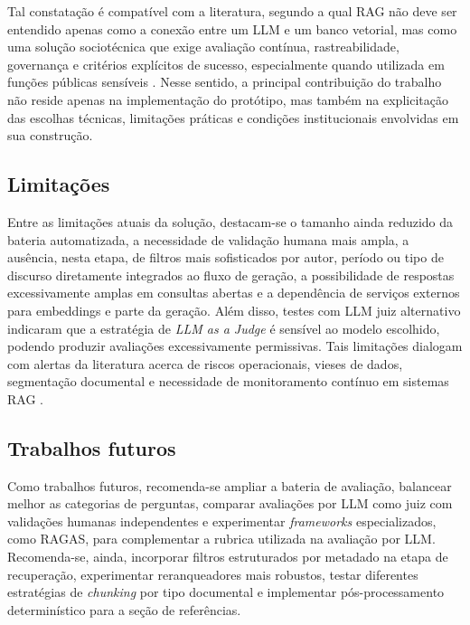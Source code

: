 Tal constatação é compatível com a literatura, segundo a qual RAG não deve ser entendido apenas como a conexão entre um LLM e um banco vetorial, mas como uma solução sociotécnica que exige avaliação contínua, rastreabilidade, governança e critérios explícitos de sucesso, especialmente quando utilizada em funções públicas sensíveis \parencite{gao2023ragSurvey,deAlmeidaSantos2025aiGovernance,saadFalconEtAl2024ares}. Nesse sentido, a principal contribuição do trabalho não reside apenas na implementação do protótipo, mas também na explicitação das escolhas técnicas, limitações práticas e condições institucionais envolvidas em sua construção.

\subsection{Limitações}

Entre as limitações atuais da solução, destacam-se o tamanho ainda reduzido da bateria automatizada, a necessidade de validação humana mais ampla, a ausência, nesta etapa, de filtros mais sofisticados por autor, período ou tipo de discurso diretamente integrados ao fluxo de geração, a possibilidade de respostas excessivamente amplas em consultas abertas e a dependência de serviços externos para embeddings e parte da geração. Além disso, testes com LLM juiz alternativo indicaram que a estratégia de \textit{LLM as a Judge} é sensível ao modelo escolhido, podendo produzir avaliações excessivamente permissivas. Tais limitações dialogam com alertas da literatura acerca de riscos operacionais, vieses de dados, segmentação documental e necessidade de monitoramento contínuo em sistemas RAG \parencite{gao2023ragSurvey,wangEtAl2025segmentation,liuEtAl2025judgeRag}.

\subsection{Trabalhos futuros}

Como trabalhos futuros, recomenda-se ampliar a bateria de avaliação, balancear melhor as categorias de perguntas, comparar avaliações por LLM como juiz com validações humanas independentes e experimentar \textit{frameworks} especializados, como RAGAS, para complementar a rubrica utilizada na avaliação por LLM. Recomenda-se, ainda, incorporar filtros estruturados por metadado na etapa de recuperação, experimentar reranqueadores mais robustos, testar diferentes estratégias de \textit{chunking} por tipo documental e implementar pós-processamento determinístico para a seção de referências.

